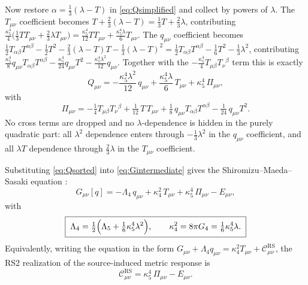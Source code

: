 \documentclass[11pt,a4paper]{article}
\theoremstyle{plain}
\theoremstyle{definition}
\newcommand{\kfive}{\kappa_5}
\newcommand{\kfour}{\kappa_4}
\newcommand{\Lfive}{\Lambda_5}
\newcommand{\Lfour}{\Lambda_4}
\newcommand{\RS}{\mathrm{RS}}
\begin{document}
Now restore $\alpha=\tfrac13(\lambda-T)$ in \eqref{eq:Qsimplified} and
collect by powers of $\lambda$. The $T_{\mu\nu}$ coefficient becomes
$T+\tfrac23(\lambda-T)=\tfrac13T+\tfrac23\lambda$, contributing
$\tfrac{\kfive^4}{4}\bigl(\tfrac13 T T_{\mu\nu}
+\tfrac23\lambda T_{\mu\nu}\bigr)
=\tfrac{\kfive^4}{12}TT_{\mu\nu}+\tfrac{\kfive^4\lambda}{6}T_{\mu\nu}$.
The $q_{\mu\nu}$ coefficient becomes
$\tfrac12 T_{\alpha\beta}T^{\alpha\beta}-\tfrac12T^2
-\tfrac23(\lambda-T)T-\tfrac13(\lambda-T)^2
=\tfrac12T_{\alpha\beta}T^{\alpha\beta}-\tfrac16T^2-\tfrac13\lambda^2$,
contributing
$\tfrac{\kfive^4}{8}q_{\mu\nu}T_{\alpha\beta}T^{\alpha\beta}
-\tfrac{\kfive^4}{24}q_{\mu\nu}T^2
-\tfrac{\kfive^4\lambda^2}{12}q_{\mu\nu}$. Together with the
$-\tfrac{\kfive^4}{4}T_{\mu\beta}T_\nu{}^\beta$ term this is exactly
\begin{equation}
\label{eq:Qsorted}
\boxed{\;
Q_{\mu\nu}
=-\frac{\kfive^4\lambda^2}{12}\,q_{\mu\nu}
+\frac{\kfive^4\lambda}{6}\,T_{\mu\nu}
+\kfive^4\,\Pi_{\mu\nu},
\;}
\end{equation}
with
\begin{equation}
\label{eq:Pi}
\boxed{\;
\Pi_{\mu\nu}
=-\tfrac14 T_{\mu\beta}T_\nu{}^\beta
+\tfrac1{12}\,T\,T_{\mu\nu}
+\tfrac18\,q_{\mu\nu}T_{\alpha\beta}T^{\alpha\beta}
-\tfrac1{24}\,q_{\mu\nu}T^2 .
\;}
\end{equation}
No cross terms are dropped and no $\lambda$-dependence is hidden in the
purely quadratic part: all $\lambda^2$ dependence enters through
$-\tfrac13\lambda^2$ in the $q_{\mu\nu}$ coefficient, and all $\lambda T$
dependence through $\tfrac23\lambda$ in the $T_{\mu\nu}$ coefficient.

Substituting \eqref{eq:Qsorted} into \eqref{eq:Gintermediate} gives the
Shiromizu--Maeda--Sasaki equation \cite{SMS}:
\begin{equation}
\label{eq:SMS}
\boxed{\;
G_{\mu\nu}[q]
=-\Lfour\,q_{\mu\nu}
+\kfour^2\,T_{\mu\nu}
+\kfive^4\,\Pi_{\mu\nu}
-E_{\mu\nu},
\;}
\end{equation}
with
\begin{equation}
\label{eq:constants}
\boxed{\;
\Lfour=\tfrac12\Bigl(\Lfive+\tfrac16\kfive^4\lambda^2\Bigr),
\qquad
\kfour^2=8\pi G_4=\tfrac16\kfive^4\lambda .
\;}
\end{equation}
Equivalently, writing the equation in the form
$G_{\mu\nu}+\Lfour q_{\mu\nu}=\kfour^2T_{\mu\nu}
+\mathcal C^{\RS}_{\mu\nu}$, the RS2 realization of the
source-induced metric response is
\begin{equation}
\label{eq:CRS}
\boxed{\;
\mathcal C^{\RS}_{\mu\nu}
=\kfive^4\,\Pi_{\mu\nu}-E_{\mu\nu}.
\;}
\end{equation}
\end{document}
